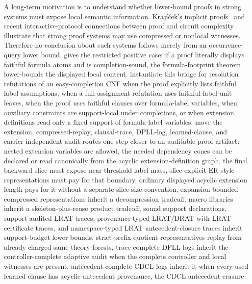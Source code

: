 \documentclass[11pt]{article}
\theoremstyle{definition}
\begin{document}
A long-term motivation is to understand whether lower-bound proofs in strong systems must expose local semantic information.  Kraj\'i\v{c}ek's implicit proofs~\cite{Krajicek04} and recent interactive-protocol connections between proof and circuit complexity~\cite{AKPS24} illustrate that strong proof systems may use compressed or nonlocal witnesses.  Therefore no conclusion about such systems follows merely from an occurrence-query lower bound.   gives the restricted positive case: if a proof literally displays faithful formula atoms and is completion-sound, the formula-footprint theorem lower-bounds the displayed local content.   instantiate this bridge for resolution refutations of an easy-completion CNF when the proof explicitly lists faithful label assumptions, when a full-assignment refutation uses faithful label-unit leaves, when the proof uses faithful clauses over formula-label variables, when auxiliary constraints are support-local under completions, or when extension definitions read only a fixed support of formula-label variables.   move the extension, compressed-replay, clausal-trace, DPLL-log, learned-clause, and carrier-independent audit routes one step closer to an auditable proof artifact: nested extension variables are allowed, the needed dependency cones can be declared or read canonically from the acyclic extension-definition graph, the final backward slice must expose near-threshold label mass, slice-explicit ER-style representations must pay for that boundary, ordinary displayed acyclic extension length pays for it without a separate slice-size convention, expansion-bounded compressed representations inherit a decompression tradeoff, macro libraries inherit a skeleton-plus-reuse product tradeoff, sound support declarations, support-audited LRAT traces, provenance-typed LRAT/DRAT-with-LRAT-certificate traces, and namespace-typed LRAT antecedent-closure traces inherit support-budget lower bounds, strict-prefix quotient representatives replay from already charged same-theory forests, trace-complete DPLL logs inherit the controller-complete adaptive audit when the complete controller and local witnesses are present, antecedent-complete CDCL logs inherit it when every used learned clause has acyclic antecedent provenance, the CDCL antecedent-erasure 
\end{document}
